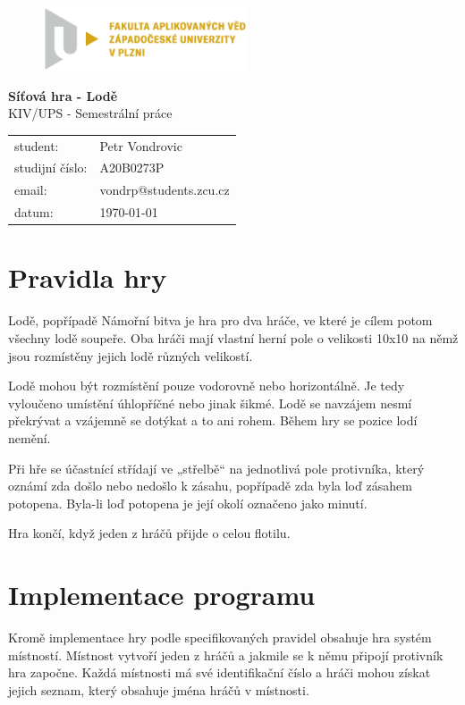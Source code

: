 \documentclass[12pt, a4paper]{article} %
\begin{document}
	\begin{titlepage}
		\begin{figure}[H]
			\includegraphics[width=6cm]{images/FAV_cmyk.eps}
		\end{figure}
		\vspace{3cm}
		\begin{center}
			\huge{\textbf{Síťová hra - Lodě}} \\
			\Large KIV/UPS - Semestrální práce
		\end{center}
		\vfill
		\begin{table}[H]
			\begin{tabular}{l l}
				student: & Petr Vondrovic\\
				studijní číslo: & A20B0273P\\
				email: & vondrp@students.zcu.cz\\
				datum: & \today
			\end{tabular}
		\end{table}
	\end{titlepage}
	\pagebreak
	\setcounter{page}{2}
	\section{Pravidla hry}
	\par Lodě, popřípadě Námořní bitva je hra pro dva hráče, ve které je cílem potom všechny lodě soupeře. Oba hráči mají vlastní herní pole o velikosti 10x10 na němž jsou rozmístěny jejich lodě různých velikostí.
	
	\par Lodě mohou být rozmístění pouze vodorovně nebo horizontálně. Je tedy vyloučeno umístění úhlopříčné nebo jinak šikmé. Lodě se navzájem nesmí překrývat a vzájemně se dotýkat a to ani rohem. Během hry se pozice lodí nemění.
	
	
	\par Při hře se účastnící střídají ve  „střelbě“ na jednotlivá pole protivníka, který oznámí zda došlo nebo nedošlo k zásahu, popřípadě zda byla loď zásahem potopena. Byla-li loď potopena je její okolí označeno jako minutí.
	
	\par Hra končí, když jeden z hráčů přijde o celou flotilu.
		
	\section{Implementace programu}
	\par Kromě implementace hry podle specifikovaných pravidel obsahuje hra systém místností. Místnost vytvoří jeden z hráčů a jakmile se k němu připojí protivník hra započne. Každá místnosti má své identifikační číslo a hráči mohou získat jejich seznam, který obsahuje jména hráčů v místnosti.
		
\end{document}
